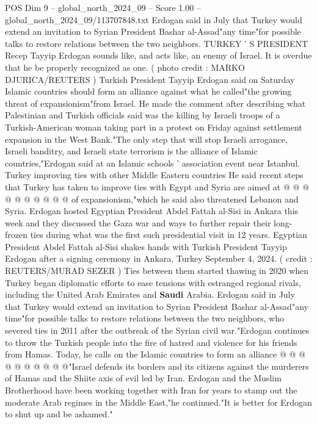 \begin{textsample}{POS Dim 9 – global\_north\_2024\_09 – Score 1.00 – global\_north\_2024\_09/113707848.txt}  \label{ex:f9_pos_431}
Erdogan said in July that Turkey would extend an invitation to Syrian President Bashar al-Assad"any time"for possible talks to restore relations between the two neighbors.
TURKEY ' S PRESIDENT Recep Tayyip Erdogan sounds like, and acts like, an enemy of Israel.
It is overdue that he be properly recognized as one. ( photo credit : MARKO DJURICA/REUTERS ) Turkish President Tayyip Erdogan said on Saturday Islamic countries should form an alliance against what he called"the growing threat of expansionism"from Israel.
He made the comment after describing what Palestinian and Turkish officials said was the killing by Israeli troops of a Turkish-American woman taking part in a protest on Friday against settlement expansion in the West Bank."The only step that will stop Israeli arrogance, Israeli banditry, and Israeli state terrorism is the alliance of Islamic countries,"Erdogan said at an Islamic schools ' association event near Istanbul.
Turkey improving ties with other Middle Eastern countries He said recent steps that Turkey has taken to improve ties with Egypt and Syria are aimed at @ @ @ @ @ @ @ @ @ @ of expansionism,"which he said also threatened Lebanon and Syria.
Erdogan hosted Egyptian President Abdel Fattah al-Sisi in Ankara this week and they discussed the Gaza war and ways to further repair their long-frozen ties during what was the first such presidential visit in 12 years.
Egyptian President Abdel Fattah al-Sisi shakes hands with Turkish President Tayyip Erdogan after a signing ceremony in Ankara, Turkey September 4, 2024. ( credit : REUTERS/MURAD SEZER ) Ties between them started thawing in 2020 when Turkey began diplomatic efforts to ease tensions with estranged regional rivals, including the United Arab Emirates and \textbf{Saudi} Arabia.
Erdogan said in July that Turkey would extend an invitation to Syrian President Bashar al-Assad"any time"for possible talks to restore relations between the two neighbors, who severed ties in 2011 after the outbreak of the Syrian civil war."Erdogan continues to throw the Turkish people into the fire of hatred and violence for his friends from Hamas.
Today, he calls on the Islamic countries to form an alliance @ @ @ @ @ @ @ @ @ @"Israel defends its borders and its citizens against the murderers of Hamas and the Shiite axis of evil led by Iran.
Erdogan and the Muslim Brotherhood have been working together with Iran for years to stamp out the moderate Arab regimes in the Middle East,"he continued."It is better for Erdogan to shut up and be ashamed."

\end{textsample}
